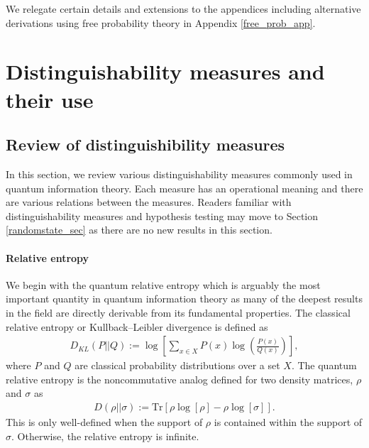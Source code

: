 \documentclass[a4paper,11pt]{article}
\newcommand{\Tr}{\text{Tr}}
\newcommand*{\JKF}[1]{\textcolor{blue}{[JKF: #1]}}
\begin{document}
We relegate certain details and extensions to the appendices including alternative derivations using free probability theory in Appendix \ref{free_prob_app}.




\section{Distinguishability measures and their use}
\label{disting_sec}

\subsection{Review of distinguishibility measures}


In this section, we review various distinguishability measures commonly used in quantum information theory. Each measure has an operational meaning and there are various relations between the measures. Readers familiar with distinguishability measures and hypothesis testing may move to Section \ref{randomstate_sec} as there are no new results in this section. 

\paragraph{Relative entropy}
We begin with the quantum relative entropy which is arguably the most important quantity in quantum information theory as many of the deepest results in the field are directly derivable from its fundamental properties. The classical relative entropy or Kullback–Leibler divergence is defined as
\begin{align}
    D_{KL}(P||Q):= \log\left[ \sum_{x\in X} P(x)\log \left( \frac{P(x)}{Q(x)}\right)\right],
\end{align}
where $P$ and $Q$ are classical probability distributions over a set $X$.
The quantum relative entropy is the noncommutative analog defined for two density matrices, $\rho$ and $\sigma$ as
\begin{align}
    D(\rho || \sigma) := \Tr \left[\rho \log\left[ \rho\right] - \rho \log \left[\sigma\right]\right].
\end{align}
This is only well-defined when the support of $\rho$ is contained within the support of $\sigma$. Otherwise, the relative entropy is infinite. 
\end{document}

